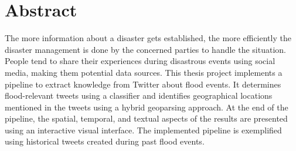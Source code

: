 \section*{Abstract}

The more information about a disaster gets established, the more efficiently the disaster management
is done by the concerned parties to handle the situation. People tend to share their experiences
during disastrous events using social media, making them potential data sources. This thesis project
implements a pipeline to extract knowledge from Twitter about flood events. It determines
flood-relevant tweets using a classifier and identifies geographical locations mentioned in the
tweets using a hybrid geoparsing approach. At the end of the pipeline, the spatial, temporal, and
textual aspects of the results are presented using an interactive visual interface. The implemented
pipeline is exemplified using historical tweets created during past flood events.

